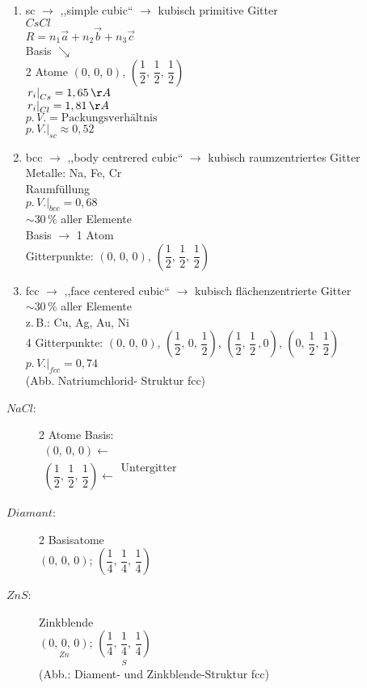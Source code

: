 \nr

\begin{enumerate}
\item sc $\rightarrow$ ,,simple cubic{}`` $\rightarrow$ kubisch primitive
Gitter \\
$CsCl$ \\
$R=n_{1}\vec{a}+n_{2}\vec{b}+n_{3}\vec{c}$\\
Basis $\searrow$\\
2 Atome $\left(0,\,0,\,0\right)$, $\left(\dfrac{1}{2},\,\dfrac{1}{2},\,\dfrac{1}{2}\right)$
\\
$\left.r_{i}\right|_{Cs}=1,65\,\AA$ \\
$\left.r_{i}\right|_{Cl}=1,81\,\AA$ \\
$p.\, V.=\text{Packungsverhältnis }$\\
$\left.p.\, V.\right|_{sc}\approx0,52$
\item bcc $\rightarrow$ ,,body centrered cubic{}`` $\rightarrow$ kubisch
raumzentriertes Gitter\\
Metalle: Na, Fe, Cr \\
Raumfüllung\\
$\left.p.\, V.\right|_{bcc}=0,68$ \\
$\sim30\,\%$ aller Elemente \\
Basis $\rightarrow$ 1 Atom \\
Gitterpunkte: $\left(0,\,0,\,0\right)$, $\left(\dfrac{1}{2},\,\dfrac{1}{2},\,\dfrac{1}{2}\right)$\\

\item fcc $\rightarrow$ ,,face centered cubic{}`` $\rightarrow$ kubisch
flächenzentrierte Gitter\\
$\sim30\,\%$ aller Elemente\\
z.\,B.: Cu, Ag, Au, Ni\\
4 Gitterpunkte: $\left(0,\,0,\,0\right)$, $\left(\dfrac{1}{2},\,0,\,\dfrac{1}{2}\right)$,
$\left(\dfrac{1}{2},\,\dfrac{1}{2}\,,0\right)$, $\left(0,\,\dfrac{1}{2},\,\dfrac{1}{2}\right)$\\
$\left.p.\, V.\right|_{fcc}=0,74$ \\
(Abb. Natriumchlorid- Struktur fcc) \end{enumerate}
\begin{description}
\item [{$NaCl$:}] 2 Atome Basis:\\
$\begin{array}{c}
\left(0,\,0,\,0\right)\leftarrow\\
\left(\dfrac{1}{2},\,\dfrac{1}{2},\,\dfrac{1}{2}\right)\leftarrow\end{array}\text{Untergitter }$ 
\item [{$Diamant$:}] 2 Basisatome\\
$\left(0,\,0,\,0\right)$; $\left(\dfrac{1}{4},\,\dfrac{1}{4},\,\dfrac{1}{4}\right)$
\item [{$ZnS$:}] Zinkblende \\
$\underset{Zn}{\left(0,\,0,\,0\right)}$; $\underset{S}{\left(\dfrac{1}{4},\,\dfrac{1}{4},\,\dfrac{1}{4}\right)}$
\\
(Abb.: Diament- und Zinkblende-Struktur fcc)
\item [{\setcounter{enumi}{3} }]~\end{description}
